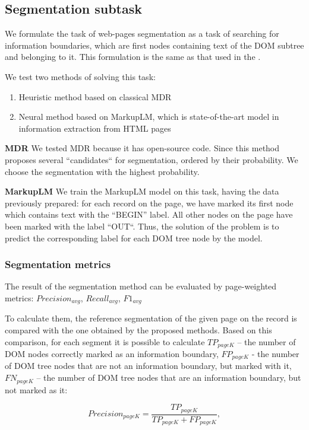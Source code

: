\subsection{Segmentation subtask} \label{segmentation}
We formulate the task of web-pages segmentation as a task of searching for information boundaries, which are first nodes containing text of the DOM subtree and belonging to it. This formulation is the same as that used in the \cite{san_plate_2023}.

We test two methods of solving this task:
\begin{enumerate}
    \item Heuristic method based on classical MDR
    \item Neural method based on MarkupLM, which is state-of-the-art model in information extraction from HTML pages 
\end{enumerate}

\textbf{MDR} We tested MDR because it has open-source code. Since this method proposes several ``candidates`` for segmentation, ordered by their probability. We choose the segmentation with the highest probability.

\textbf{MarkupLM} We train the MarkupLM model on this task, having the data previously prepared: for each record on the page, we have marked its first node which contains text with the “BEGIN” label. All other nodes on the page have been marked with the label “OUT“. Thus, the solution of the problem is to predict the corresponding label for each DOM tree node by the model.

\subsubsection*{Segmentation metrics}
The result of the segmentation method can be evaluated by page-weighted metrics: $Precision_{avg}$, $Recall_{avg}$, $F1_{avg}$

To calculate them, the reference segmentation of the given page on the record is compared with the one obtained by the proposed methods. Based on this comparison, for each segment it is possible to calculate $TP_{page K}$ -- the number of DOM nodes correctly marked as an information boundary, $FP_{page K}$ - the number of DOM tree nodes that are not an information boundary, but marked with it, $FN_{page K}$ -- the number of DOM tree nodes that are an information boundary, but not marked as it:

$$
Precision_{page K} = \frac{TP_{page K}}{TP_{page K} + FP_{page K}}, 
$$

